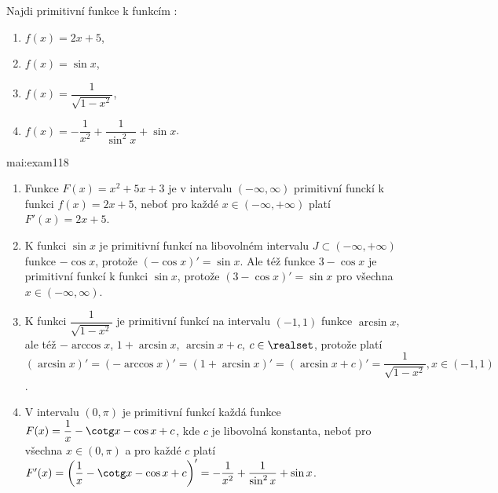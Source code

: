 \begin{mathexam}{Najdi primitivní funkce k funkcím \cite[s.~254]{Brabec1989}:
  \begin{enumerate}
    \item \(f(x) = 2x+5\),
    \item \(f(x) = \sin x\),
    \item \(f(x) = \dfrac{1}{\sqrt{1-x^2}}\),
    \item \(f(x) = -\dfrac{1}{x^2} + \dfrac{1}{\sin^2x} + \sin x\).
  \end{enumerate}
}{mai:exam118}
  \begin{enumerate}
    \item Funkce \(F(x) = x^2+5x+3\) je v intervalu \((-\infty, \infty)\) primitivní funckí k funkci
          \(f(x) = 2x+5\), neboť pro každé \(x\in(-\infty,+\infty)\) platí \(F'(x)=2x+5\).

    \item K funkci \(\sin x\) je primitivní funkcí na libovolném intervalu
          \(J\subset(-\infty,+\infty)\) funkce \(-\cos x\), protože \((-\cos x)' = \sin x\). Ale též
          funkce \(3-\cos x\) je primitivní funkcí k funkci \(\sin x\), protože \((3 - \cos x)' =
          \sin x\) pro všechna \(x\in(-\infty, \infty)\).

    \item K funkci  \(\dfrac{1}{\sqrt{1-x^2}}\) je primitivní funkcí na intervalu \((-1, 1)\) funkce
          \(\arcsin x\), ale též \(-\arccos x\), \(1 + \arcsin x\), \(\arcsin x + c\),
          \(c\in\realset\), protože platí \((\arcsin x)' = (-\arccos x)' = (1+\arcsin x)' = (\arcsin
          x + c)' = \dfrac{1}{\sqrt{1-x^2}}, x\in(-1, 1)\).

    \item V intervalu \((0,\pi)\) je primitivní funkcí každá funkce \(F(x) = \dfrac{1}{x}-\cotg x -
          \cos x + c\), kde \(c\) je libovolná konstanta, neboť pro všechna \(x\in(0,\pi)\) a pro
          každé \(c\) platí \(F'(x) = \left(\dfrac{1}{x}-\cotg x -\cos x +c\right)'= -\dfrac{1}{x^2}
          + \dfrac{1}{\sin^2x} + \sin x\).
  \end{enumerate}
\end{mathexam}